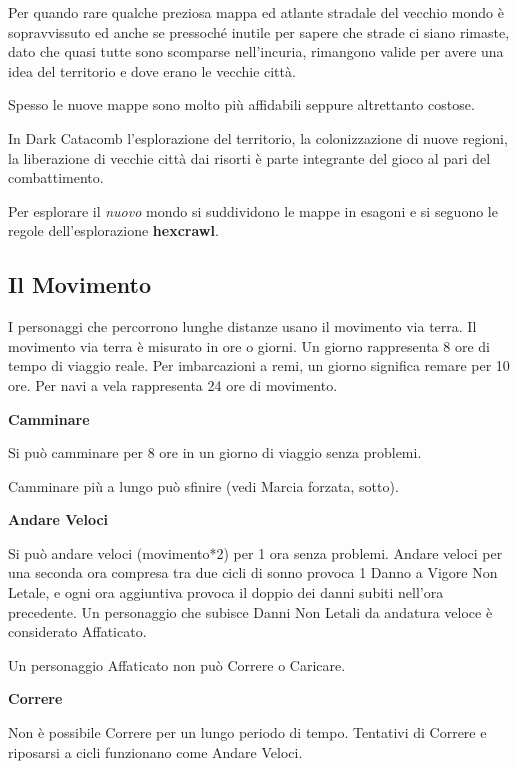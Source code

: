 \documentclass[12pt,a4paper,twoside,openany]{book}
\begin{document}
\begin{multicols}{2}

Per quando rare qualche preziosa mappa ed atlante stradale del vecchio mondo è sopravvissuto ed anche se pressoché inutile per sapere che strade ci siano rimaste, dato che quasi tutte sono scomparse nell'incuria, rimangono valide per avere una idea del territorio e dove erano le vecchie città.

Spesso le nuove mappe sono molto più affidabili seppure altrettanto costose.

\begin{narratore}
In Dark Catacomb l'esplorazione del territorio, la colonizzazione di nuove regioni, la liberazione di vecchie città dai risorti è parte integrante del gioco al pari del combattimento.
\end{narratore}

Per esplorare il \textit{nuovo} mondo si suddividono le mappe in esagoni e si seguono le regole dell'esplorazione \textbf{hexcrawl}.

\subsection{Il Movimento}


I personaggi che percorrono lunghe distanze usano il movimento via terra. Il movimento via terra è misurato in ore o giorni. Un giorno rappresenta 8 ore di tempo di viaggio reale. Per imbarcazioni a remi, un giorno significa remare per 10 ore. Per navi a vela rappresenta 24 ore di movimento.

\textbf{Camminare}\label{camminare}

Si può camminare per 8 ore in un giorno di viaggio senza problemi.

Camminare più a lungo può sfinire (vedi Marcia forzata, sotto).

\textbf{Andare Veloci}\label{andareveloci}

Si può andare veloci (movimento*2) per 1 ora senza problemi. Andare veloci per una seconda ora compresa tra due cicli di sonno provoca 1 Danno a Vigore Non Letale, e ogni ora aggiuntiva provoca il doppio dei danni subiti nell'ora precedente. Un personaggio che subisce Danni Non Letali da andatura veloce è considerato Affaticato.

Un personaggio Affaticato non può Correre o Caricare.

\textbf{Correre}\label{correre}

Non è possibile Correre per un lungo periodo di tempo. Tentativi di Correre e riposarsi a cicli funzionano come Andare Veloci.


\end{multicols}
\end{document}
